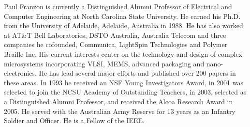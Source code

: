 \documentclass[journal]{IEEEtran}
\begin{document}
\begin{IEEEbiographynophoto}{Paul Franzon}
is currently a Distinguished Alumni Professor of Electrical and Computer Engineering at North Carolina State University.  He earned his Ph.D. from the University of Adelaide, Adelaide, Australia in 1988.  He has also worked at AT\&T Bell Laboratories, DSTO Australia, Australia Telecom and three companies he cofounded, Communica, LightSpin Technologies and Polymer Braille Inc. His current interests center on the technology and design of complex microsystems incorporating VLSI, MEMS, advanced packaging and nano-electronics. He has lead several major efforts and published over 200 papers in these areas.  In 1993 he received an NSF Young Investigators Award, in 2001 was selected to join the NCSU Academy of Outstanding Teachers, in 2003, selected as a Distinguished Alumni Professor, and received the Alcoa Research Award in 2005.  He served with the Australian Army Reserve for 13 years as an Infantry Soldier and Officer.  He is a Fellow of the IEEE.\end{IEEEbiographynophoto}






\end{document}
